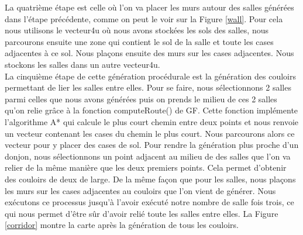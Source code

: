 \documentclass[a4paper, 12pt]{article}
\begin{document}
La quatrième étape est celle où l'on va placer les murs autour des salles générées dans l'étape précédente, comme on peut le voir sur la Figure \ref{wall}. Pour cela nous utilisons le vecteur4u où nous avons stockées les sols des salles, nous parcourons ensuite une zone qui contient le sol de la salle et toute les cases adjacentes à ce sol. Nous plaçons ensuite des murs sur les cases adjacentes. Nous stockons les salles dans un autre vecteur4u. \\

La cinquième étape de cette génération procédurale est la génération des couloirs permettant de lier les salles entre elles. Pour se faire, nous sélectionnons 2 salles parmi celles que nous avons générées puis on prends le milieu de ces 2 salles qu'on relie grâce à la fonction computeRoute() de GF. Cette fonction implémente l'algorithme A* qui calcule le plus court chemin entre deux points et nous renvoie un vecteur contenant les cases du chemin le plus court. Nous parcourons alors ce vecteur pour y placer des cases de sol. Pour rendre la génération plus proche d'un donjon, nous sélectionnons un point adjacent au milieu de des salles que l'on va relier de la même manière que les deux premiers points. Cela permet d'obtenir des couloirs de deux de large. De la même façon que pour les salles, nous plaçons les murs sur les cases adjacentes au couloirs que l'on vient de générer. Nous exécutons ce processus jusqu'à l'avoir exécuté notre nombre de salle fois trois, ce qui nous permet d'être sûr d'avoir relié toute les salles entre elles. La Figure \ref{corridor} montre la carte après la génération de tous les couloirs.
\end{document}
